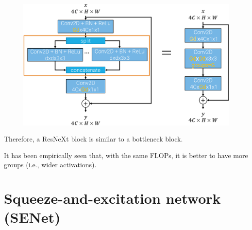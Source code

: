\begin{description}
\begin{description}
\begin{descriptionlist}
                        \begin{figure}[H]
                            \centering
                            \includegraphics[width=0.6\linewidth]{./img/_resnext_to_resnet_l2.pdf}
                        \end{figure}
                \end{descriptionlist}

            \begin{remark}
                Therefore, a ResNeXt block is similar to a bottleneck block.
            \end{remark}
        \end{description}
\end{description}

\begin{remark}
    It has been empirically seen that, with the same FLOPs, it is better to have more groups (i.e., wider activations).
\end{remark}



\section{Squeeze-and-excitation network (SENet)}

